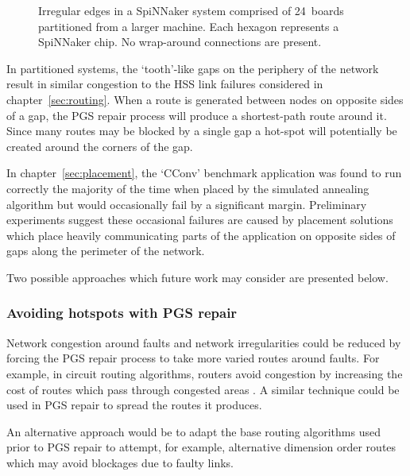 			\begin{figure}
				\center
				
				\caption[Irregular edges of a partitioned SpiNNaker system.]%
				{Irregular edges in a SpiNNaker system comprised of 24~boards
				partitioned from a larger machine.  Each hexagon represents a SpiNNaker
				chip. No wrap-around connections are present.}
				\label{fig:spalloc-mesh}
			\end{figure}
			
			In partitioned systems, the `tooth'-like gaps on the periphery of the
			network result in similar congestion to the HSS link failures considered
			in chapter~\ref{sec:routing}. When a route is generated between nodes on
			opposite sides of a gap, the PGS repair process will produce a
			shortest-path route around it. Since many routes may be blocked by a
			single gap a hot-spot will potentially be created around the corners of
			the gap.
			
			In chapter~\ref{sec:placement}, the `CConv' benchmark application was
			found to run correctly the majority of the time when placed by the
			simulated annealing algorithm but would occasionally fail by a
			significant margin. Preliminary experiments suggest these occasional
			failures are caused by placement solutions which place heavily
			communicating parts of the application on opposite sides of gaps along the
			perimeter of the network.
			
			Two possible approaches which future work may consider are presented
			below.
			
			\subsubsection{Avoiding hotspots with PGS repair}
				
				\label{sec:pgs-repair-improvements}	
				
				Network congestion around faults and network irregularities could be
				reduced by forcing the PGS repair process to take more varied routes
				around faults. For example, in circuit routing algorithms, routers
				avoid congestion by increasing the cost of routes which pass through
				congested areas \cite{kahng11}. A similar technique could be used in
				PGS repair to spread the routes it produces.
				
				An alternative approach would be to adapt the base routing algorithms
				used prior to PGS repair to attempt, for example, alternative dimension
				order routes which may avoid blockages due to faulty links.
			
